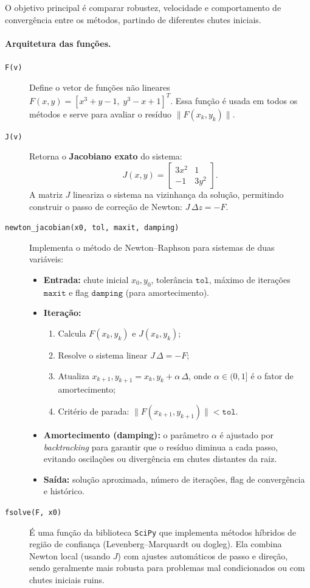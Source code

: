 \documentclass[12pt,a4paper]{article}
\begin{document}
O objetivo principal é comparar robustez, velocidade e comportamento de convergência entre os métodos, partindo de diferentes chutes iniciais.

\paragraph{Arquitetura das funções.}
\begin{description}
  \item[\texttt{F(v)}] 
  Define o vetor de funções não lineares \(F(x,y) = [x^3 + y - 1,\; y^3 - x + 1]^T\).
  Essa função é usada em todos os métodos e serve para avaliar o resíduo \(\|F(x_k,y_k)\|\).

  \item[\texttt{J(v)}]
  Retorna o \textbf{Jacobiano exato} do sistema:
  \[
  J(x,y) =
  \begin{bmatrix}
  3x^2 & 1 \\
  -1 & 3y^2
  \end{bmatrix}.
  \]
  A matriz \(J\) lineariza o sistema na vizinhança da solução, permitindo construir o passo de correção de Newton:
  \( J\,\Delta z = -F \).

  \item[\texttt{newton\_jacobian(x0, tol, maxit, damping)}]
  Implementa o método de Newton–Raphson para sistemas de duas variáveis:
  \begin{itemize}
    \item \textbf{Entrada:} chute inicial \(x_0,y_0\), tolerância \(\texttt{tol}\), máximo de iterações \(\texttt{maxit}\) e flag \(\texttt{damping}\) (para amortecimento).
    \item \textbf{Iteração:}
      \begin{enumerate}
        \item Calcula \(F(x_k,y_k)\) e \(J(x_k,y_k)\);
        \item Resolve o sistema linear \(J\,\Delta = -F\);
        \item Atualiza \(x_{k+1},y_{k+1} = x_k,y_k + \alpha\,\Delta\), onde \(\alpha \in (0,1]\) é o fator de amortecimento;
        \item Critério de parada: \(\|F(x_{k+1},y_{k+1})\| < \texttt{tol}\).
      \end{enumerate}
    \item \textbf{Amortecimento (damping):} o parâmetro \(\alpha\) é ajustado por \emph{backtracking} para garantir que o resíduo diminua a cada passo, evitando oscilações ou divergência em chutes distantes da raiz.
    \item \textbf{Saída:} solução aproximada, número de iterações, flag de convergência e histórico.
  \end{itemize}

  \item[\texttt{fsolve(F, x0)}]
  É uma função da biblioteca \texttt{SciPy} que implementa métodos híbridos de região de confiança (Levenberg–Marquardt ou dogleg). 
  Ela combina Newton local (usando \(J\)) com ajustes automáticos de passo e direção, sendo geralmente mais robusta para problemas mal condicionados ou com chutes iniciais ruins.
\end{description}
\end{document}

